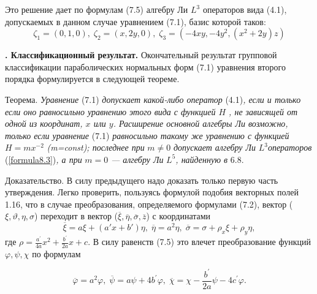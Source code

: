 \documentclass[twoside]{article}
\newcounter{nrazd}
\newcommand{\razd}[1]
{
  \addtocounter{nrazd}{1} 
  \setcounter{equation}{0} 
  \textbf{\thenrazd. #1} 
}
\begin{document}
  \fancyhead[LE, RO]{\thepage}

    \noindent Это решение дает по формулам (7.5) алгебру Ли $L^3$ операторов вида (4.1), допускаемых в данном случае уравнением (7.1), базис которой таков:
    \setcounter{equation}{2}
    \begin{equation} \label{formula8.3}
      \zeta_1 = (0,1,0),\;
      \zeta_2 = (x,2y,0),\;
      \zeta_3 = (-4xy,-4y^2,(x^2+2y)z)
    \end{equation}

  \razd{Классификационный результат.}Окончательный результат групповой классификации параболических нормальных форм (7.1) уравнения второго порядка формулируется в следующей теореме.

    Т\;е\;о\;р\;е\;м\;а. \textit{Уравнение} (7.1) \textit{допускает какой-либо оператор} (4.1)\textit{, если и только если оно равносильно уравнению этого вида с функцией $H$ , не зависящей от одной из координат, $x$ или $y$. Расширение основной алгебры Ли возможно, только если уравнение} (7.1) \textit{равносильно такому же уравнению с функцией} $ H=mx^{-2} $ \textit{(m=const); последнее при} $m \neq 0 $ \textit{допускает алгебру Ли} $ L^3$\textit{операторов} (\ref{formula8.3})\textit{, а при} $m=0$ \textit{--- алгебру Ли} $L^5$\textit{, найденную в} 6.8.

    Д\;о\;к\;а\;з\;а\;т\;е\;л\;ь\;с\;т\;в\;о.  В силу предыдущего надо доказать только первую часть утверждения. Легко проверить, пользуясь формулой подобия векторных полей 1.16, что в случае преобразования, определяемого формулами (7.2), вектор ($\xi, \vartheta, \eta, \sigma$) переходит в вектор ($\overline{\xi},\overline{\eta}, \overline{\sigma}, \overline{z}$) с координатами
    \[
      \overline{\xi}=a\xi+(a\prime x+b\prime)\eta,\;
      \overline{\eta}=a^2\eta,\;
      \overline{\sigma}=\sigma+\rho_x\xi+\rho_y\eta,
    \]
    \noindent где $\rho = \frac{a^\prime}{4a}x^2+\frac{b^\prime}{2a}x+c$. В силу равенств (7.5) это влечет преобразование функций $\varphi, \psi, \chi$ по формулам
    
    \begin{equation}\label{formula9.1}
      \overline{\varphi}=a^2\varphi,\;
      \overline{\psi}=a\psi+4b^\prime\varphi,\;
      \overline{\chi}=\chi-\frac{b^\prime}{2a}\psi-4c^\prime\varphi.
    \end{equation}
\end{document}
